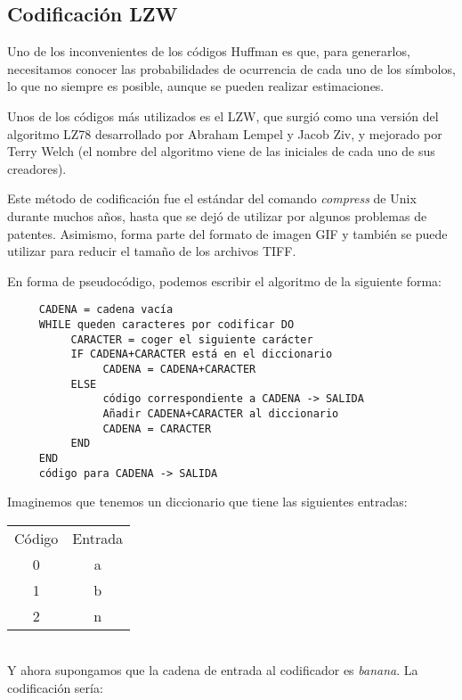 \documentclass[es,apuntes]{uah}
\begin{document}
\subsection{Codificación LZW}

Uno de los inconvenientes de los códigos Huffman es que, para generarlos, necesitamos conocer las probabilidades de ocurrencia de cada uno de los símbolos, lo que no siempre es posible, aunque se pueden realizar estimaciones. 

Unos de los códigos más utilizados es el LZW, que surgió como una versión del algoritmo LZ78 desarrollado por Abraham Lempel y Jacob Ziv, y mejorado por Terry Welch (el nombre del algoritmo viene de las iniciales de cada uno de sus creadores). 

Este método de codificación fue el estándar del comando \emph{compress} de Unix durante muchos años, hasta que se dejó de utilizar por algunos problemas de patentes. Asimismo, forma parte del formato de imagen GIF y también se puede utilizar para reducir el tamaño de los archivos TIFF.

En forma de pseudocódigo, podemos escribir el algoritmo de la siguiente forma:

\begin{verbatim}
     CADENA = cadena vacía
     WHILE queden caracteres por codificar DO
          CARACTER = coger el siguiente carácter
          IF CADENA+CARACTER está en el diccionario
               CADENA = CADENA+CARACTER
          ELSE
               código correspondiente a CADENA -> SALIDA
               Añadir CADENA+CARACTER al diccionario
               CADENA = CARACTER
          END
     END
   	 código para CADENA -> SALIDA
\end{verbatim}

Imaginemos que tenemos un diccionario que tiene las siguientes entradas: \\

\begin{tabular}{cc}
Código & Entrada \\
0 & a \\
1 & b \\	
2 & n \\
\end{tabular}
\ \\

Y ahora supongamos que la cadena de entrada al codificador es \emph{banana}. La codificación sería:\\
\end{document}

